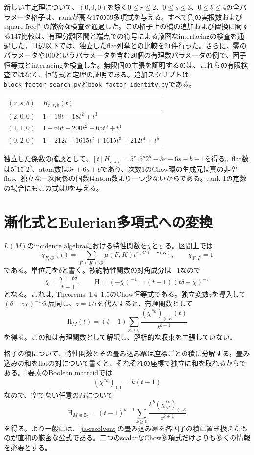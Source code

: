 \documentclass[12pt]{amsart}
\theoremstyle{definition}
\theoremstyle{remark}
\numberwithin{equation}{section}
\newcommand{\HCh}{\mathrm{H}}
\newcommand{\Bmat}{\mathsf{B}}
\begin{document}
新しい主定理について、$(0,0,0)$を除く$0\leq r\leq2$、$0\leq s\leq3$、$0\leq b\leq4$の全パラメータ格子は、rankが高々$17$の$59$多項式を与える。すべて負の実根数およびsquare-free性の厳密な検査を通過した。この格子上の橋の追加および置換に関する$147$比較は、有理分離区間と端点での符号による厳密なinterlacingの検査を通過した。11辺以下では、独立したflat列挙との比較を$21$件行った。さらに、零のパラメータや$100$というパラメータを含む20個の有理数パラメータの例で、因子恒等式とinterlacingを検査した。無限個の主張を証明するのは、これらの有限検査ではなく、恒等式と定理の証明である。追加スクリプトは\texttt{block\_factor\_search.py}と\texttt{book\_factor\_identity.py}である。
\begin{center}\small
\begin{tabular}{c|l}
$(r,s,b)$&$H_{r,s,b}(t)$\\\hline
$(2,0,0)$&$1+18t+18t^2+t^3$\\
$(1,1,0)$&$1+65t+200t^2+65t^3+t^4$\\
$(0,2,0)$&$1+212t+1615t^2+1615t^3+212t^4+t^5$
\end{tabular}
\end{center}
独立した係数の確認として、$[t]H_{r,s,b}=5^r15^s2^b-3r-6s-b-1$を得る。flat数は$5^r15^s2^b$、atom数は$3r+6s+b$であり、次数1のChow環の生成元は真の非空flat、独立な一次関係の個数はatom数より一つ少ないからである。rank 1の定数の場合にもこの式は0を与える。

\section{漸化式とEulerian多項式への変換}
$L(M)$のincidence algebraにおける特性関数を$\chi$とする。区間上では
\[
 \chi_{F,G}(t)=\sum_{F\leq K\leq G}\mu(F,K)t^{r(G)-r(K)},\qquad \chi_{F,F}=1
\]
である。単位元を$\delta$と書く。被約特性関数の対角成分は$-1$なので
\[
 \overline\chi=\frac{\chi-t\delta}{t-1},\qquad
 \HCh=(-\overline\chi)^{-1}=(t-1)(t\delta-\chi)^{-1}
\]
となる。これは\cite{FMSV24}, Theorems~1.4--1.5のChow恒等式である。独立変数$z$を導入して$(\delta-z\chi)^{-1}$を展開し、$z=1/t$を代入すると、有理関数として
\begin{equation}\label{ja-resolvent}
 \HCh_M(t)=(t-1)\sum_{k\geq0}\frac{(\chi^{*k})_{\varnothing,E}(t)}{t^{k+1}}
\end{equation}
を得る。この和は有理関数として解釈し、解析的な収束を主張していない。

格子の積について、特性関数とその畳み込み冪は座標ごとの積に分解する。畳み込みの和をflatの対について書くと、それぞれの座標で独立に和を取れるからである。1要素のBoolean matroidでは
\[
 (\chi^{*k})_{0,1}=k(t-1)
\]
なので、空でない任意の$M$について
\begin{equation}\label{ja-coloop-resolvent}
 \HCh_{M\oplus\Bmat_b}
 =(t-1)^{b+1}\sum_{k\geq0}
 \frac{k^b(\chi_M^{*k})_{\varnothing,E}}{t^{k+1}}
\end{equation}
を得る。より一般には、\eqref{ja-resolvent}の畳み込み冪を各因子の積に置き換えたものが直和の厳密な公式である。二つのscalarなChow多項式だけよりも多くの情報を必要とする。
\end{document}
